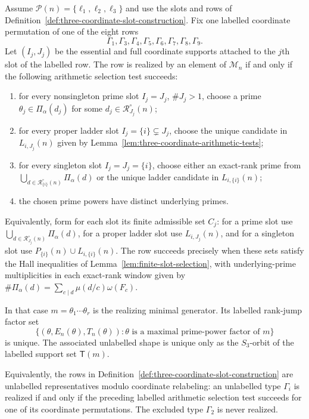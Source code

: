 \begin{lemma}
\label{lem:three-coordinate-nonemptiness}
Assume $\mathcal P(n)=\{\ell_1,\ell_2,\ell_3\}$ and use the slots and rows of
Definition~\ref{def:three-coordinate-slot-construction}. Fix one labelled
coordinate permutation of one of the eight rows
\[
\Gamma_1,
\Gamma_3,
\Gamma_4,
\Gamma_5,
\Gamma_6,
\Gamma_7,
\Gamma_8,
\Gamma_9.
\]
Let $(I_j,J_j)$ be the essential and full coordinate supports attached to the
$j$th slot of the labelled row. The row is realized by an element of
$\mathcal M_n$ if and only if the following arithmetic selection test succeeds:
\begin{enumerate}[label=(\alph*)]
\item for every nonsingleton prime slot $I_j=J_j$, $\#J_j>1$, choose a prime
$\theta_j\in\Pi_\alpha(d_j)$ for some
$d_j\in\mathcal R_{J_j}^\circ(n)$;
\item for every proper ladder slot $I_j=\{i\}\subsetneq J_j$, choose the
unique candidate in $L_{i,J_j}(n)$ given by
Lemma~\ref{lem:three-coordinate-arithmetic-tests};
\item for every singleton slot $I_j=J_j=\{i\}$, choose either an exact-rank
prime from $\bigcup_{d\in\mathcal R_{\{i\}}^\circ(n)}\Pi_\alpha(d)$ or the
unique ladder candidate in $L_{i,\{i\}}(n)$;
\item the chosen prime powers have distinct underlying primes.
\end{enumerate}
Equivalently, form for each slot its finite admissible set $C_j$: for a
prime slot use
$\bigcup_{d\in\mathcal R_{J_j}^\circ(n)}\Pi_\alpha(d)$, for a proper ladder
slot use $L_{i,J_j}(n)$, and for a singleton slot use
$P_{\{i\}}(n)\cup L_{i,\{i\}}(n)$.  The row succeeds precisely when these
sets satisfy the Hall inequalities of Lemma~\ref{lem:finite-slot-selection},
with underlying-prime multiplicities in each exact-rank window given by
$\#\Pi_\alpha(d)=\sum_{c\mid d}\mu(d/c)\omega(F_c)$.

In that case $m=\theta_1\cdots\theta_r$ is the realizing minimal generator.
Its labelled rank-jump factor set
\[
 \{(\theta,E_n(\theta),T_n(\theta)):\theta\text{ is a maximal prime-power
 factor of }m\}
\]
is unique. The associated unlabelled shape is unique only as the $S_3$-orbit
of the labelled support set $\mathsf T(m)$.

Equivalently, the rows in
Definition~\ref{def:three-coordinate-slot-construction} are unlabelled
representatives modulo coordinate relabeling: an unlabelled type $\Gamma_i$ is
realized if and only if the preceding labelled arithmetic selection test
succeeds for one of its coordinate permutations. The excluded type $\Gamma_2$
is never realized.
\end{lemma}

